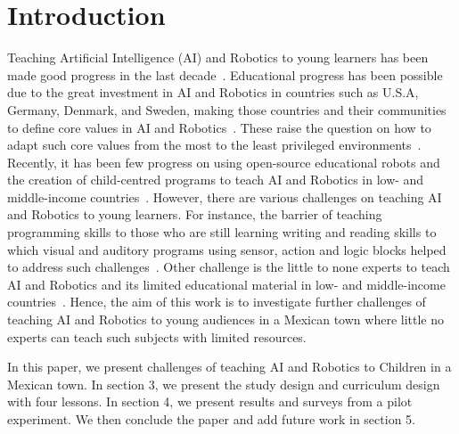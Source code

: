 \documentclass[sigconf]{acmart}
\begin{document}

\maketitle

\section{Introduction}
Teaching Artificial Intelligence (AI) and Robotics to young learners has been made good progress in the last decade~\cite{bers2019, druga2019}.
Educational progress has been possible due to the great investment in AI and Robotics in countries such as U.S.A, Germany, Denmark, and Sweden, making those countries and their communities to define core values in AI and Robotics~\cite{druga2019}. 
These raise the question on how to adapt such core values from the most to the least privileged environments~\cite{pratyusha2020}. 
Recently, it has been few progress on using open-source  educational robots and the creation of child-centred programs to teach AI and Robotics in low- and middle-income countries~\cite{abadilloperez2022_DEI_HRI2022, montenegro2021air4children}.
However, there are various challenges on teaching AI and Robotics to young learners.
For instance, the barrier of teaching programming skills to those who are still learning writing and reading skills to which visual and auditory programs using sensor, action and logic blocks helped to address such challenges~\cite{long2020, wyeth2008}.
Other challenge is the little to none experts to teach AI and Robotics and its limited educational material in low- and middle-income countries~\cite{yang2022, abadilloperez2022_DEI_HRI2022}.
Hence, the aim of this work is to investigate further challenges of teaching AI and Robotics to young audiences in a Mexican town where little no experts can teach such subjects with limited resources.

In this paper, we present challenges of teaching AI and Robotics to Children in a Mexican town.
In section 3, we present the study design and curriculum design with four lessons.
In section 4, we present results and surveys from a pilot experiment.
We then conclude the paper and add future work in section 5.
\end{document}
